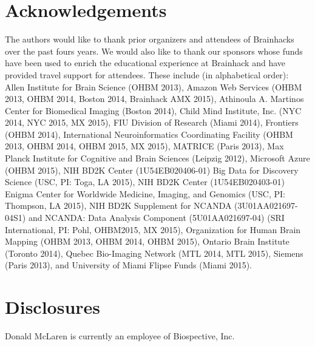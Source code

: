 \documentclass[11pt]{bmc_article_s50}
\begin{document}
\section*{Acknowledgements}
The authors would like to thank prior organizers and attendees of Brainhacks over the past fours years. We would also like to thank our sponsors whose funds have been used to enrich the educational experience at Brainhack and have provided travel support for attendees. These include (in alphabetical order): Allen Institute for Brain Science (OHBM 2013), Amazon Web Services (OHBM 2013, OHBM 2014, Boston 2014, Brainhack AMX 2015), Athinoula A. Martinos Center for Biomedical Imaging (Boston 2014), Child Mind Institute, Inc. (NYC 2014, NYC 2015, MX 2015), FIU Division of Research (Miami 2014), Frontiers (OHBM 2014), International Neuroinformatics Coordinating Facility (OHBM 2013, OHBM 2014, OHBM 2015, MX 2015), MATRICE (Paris 2013), Max Planck Institute for Cognitive and Brain Sciences (Leipzig 2012), Microsoft Azure (OHBM 2015), NIH BD2K Center (1U54EB020406-01) Big Data for Discovery Science (USC, PI: Toga, LA 2015), NIH BD2K Center (1U54EB020403-01) Enigma Center for Worldwide Medicine, Imaging, and Genomics (USC, PI: Thompson, LA 2015), NIH BD2K Supplement for NCANDA (3U01AA021697-04S1) and NCANDA: Data Analysis Component (5U01AA021697-04) (SRI International, PI: Pohl, OHBM2015, MX 2015), Organization for Human Brain Mapping (OHBM 2013, OHBM 2014, OHBM 2015), Ontario Brain Institute (Toronto 2014), Quebec Bio-Imaging Network (MTL 2014, MTL 2015), Siemens (Paris 2013), and University of Miami Flipse Funds (Miami 2015).

\section*{Disclosures}

Donald McLaren is currently an employee of Biospective, Inc.






 
 
\end{document}
